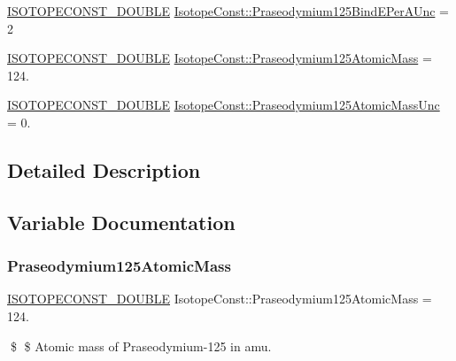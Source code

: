 \begin{DoxyCompactItemize}
\item 
\mbox{\hyperlink{group___isotope_const-_macros_ga8f45a7272ce02c0b4c65c44636ed719a}{I\+S\+O\+T\+O\+P\+E\+C\+O\+N\+S\+T\+\_\+\+D\+O\+U\+B\+LE}} \mbox{\hyperlink{group___isotope_const-_praseodymium-_pr125_ga61feaa3b80ebf348c72a020e29b487af}{Isotope\+Const\+::\+Praseodymium125\+Bind\+E\+Per\+A\+Unc}} = 2
\item 
\mbox{\hyperlink{group___isotope_const-_macros_ga8f45a7272ce02c0b4c65c44636ed719a}{I\+S\+O\+T\+O\+P\+E\+C\+O\+N\+S\+T\+\_\+\+D\+O\+U\+B\+LE}} \mbox{\hyperlink{group___isotope_const-_praseodymium-_pr125_ga048884afc50b1598faa32c9e6746a1eb}{Isotope\+Const\+::\+Praseodymium125\+Atomic\+Mass}} = 124.
\item 
\mbox{\hyperlink{group___isotope_const-_macros_ga8f45a7272ce02c0b4c65c44636ed719a}{I\+S\+O\+T\+O\+P\+E\+C\+O\+N\+S\+T\+\_\+\+D\+O\+U\+B\+LE}} \mbox{\hyperlink{group___isotope_const-_praseodymium-_pr125_gae6ee510e8146eae5699fe98f0654fea8}{Isotope\+Const\+::\+Praseodymium125\+Atomic\+Mass\+Unc}} = 0.
\end{DoxyCompactItemize}


\subsection{Detailed Description}


\subsection{Variable Documentation}
\mbox{\label{group___isotope_const-_praseodymium-_pr125_ga048884afc50b1598faa32c9e6746a1eb}} 
\subsubsection{\texorpdfstring{Praseodymium125\+Atomic\+Mass}{Praseodymium125AtomicMass}}
{\footnotesize\ttfamily \mbox{\hyperlink{group___isotope_const-_macros_ga8f45a7272ce02c0b4c65c44636ed719a}{I\+S\+O\+T\+O\+P\+E\+C\+O\+N\+S\+T\+\_\+\+D\+O\+U\+B\+LE}} Isotope\+Const\+::\+Praseodymium125\+Atomic\+Mass = 124.}

\$ \$ Atomic mass of Praseodymium-\/125 in amu. \mbox{\label{group___isotope_const-_praseodymium-_pr125_gae6ee510e8146eae5699fe98f0654fea8}} 
